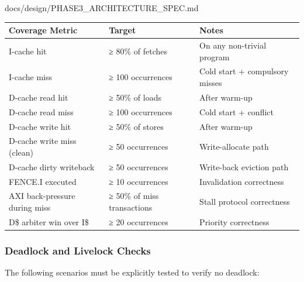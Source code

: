\begin{relocated}{docs/design/PHASE3_ARCHITECTURE_SPEC.md}
{
\begin{longtable}[]{@{}
  >{\raggedright\arraybackslash}p{}
  >{\raggedright\arraybackslash}p{}
  >{\raggedright\arraybackslash}p{}@{}}
\toprule\noalign{}
\begin{minipage}[b]{\linewidth}\raggedright
Coverage Metric
\end{minipage} & \begin{minipage}[b]{\linewidth}\raggedright
Target
\end{minipage} & \begin{minipage}[b]{\linewidth}\raggedright
Notes
\end{minipage} \\
\midrule\noalign{}
\endhead
\bottomrule\noalign{}
\endlastfoot
I-cache hit & ≥ 80\% of fetches & On any non-trivial program \\
I-cache miss & ≥ 100 occurrences & Cold start + compulsory misses \\
D-cache read hit & ≥ 50\% of loads & After warm-up \\
D-cache read miss & ≥ 100 occurrences & Cold start + conflict \\
D-cache write hit & ≥ 50\% of stores & After warm-up \\
D-cache write miss (clean) & ≥ 50 occurrences & Write-allocate path \\
D-cache dirty writeback & ≥ 50 occurrences & Write-back eviction path \\
FENCE.I executed & ≥ 10 occurrences & Invalidation correctness \\
AXI back-pressure during miss & ≥ 50\% of miss transactions & Stall
protocol correctness \\
D\$ arbiter win over I\$ & ≥ 20 occurrences & Priority correctness \\
\end{longtable}
}

\subsubsection{Deadlock and Livelock Checks}\label{ds:ch:phase3-architecture:94-deadlock-and-livelock-checks}

The following scenarios must be explicitly tested to verify no deadlock:


\end{relocated}

